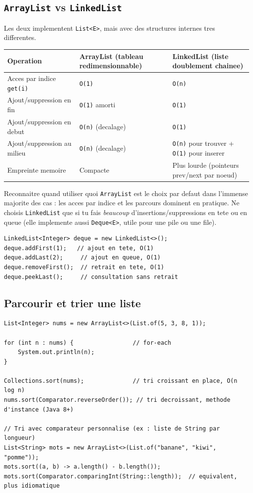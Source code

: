 \documentclass[11pt,a4paper]{article}
\begin{document}
\subsection{\texttt{ArrayList} vs \texttt{LinkedList}}

Les deux implementent \texttt{List<E>}, mais avec des structures internes tres
differentes.

\begin{longtable}{p{3.2cm}p{5.4cm}p{5.4cm}}
\toprule
\textbf{Operation} & \textbf{ArrayList} (tableau redimensionnable) & \textbf{LinkedList} (liste doublement chainee) \\
\midrule
\endhead
Acces par indice \texttt{get(i)} & \texttt{O(1)} & \texttt{O(n)} \\
Ajout/suppression en fin & \texttt{O(1)} amorti & \texttt{O(1)} \\
Ajout/suppression en debut & \texttt{O(n)} (decalage) & \texttt{O(1)} \\
Ajout/suppression au milieu & \texttt{O(n)} (decalage) & \texttt{O(n)} pour trouver + \texttt{O(1)} pour inserer \\
Empreinte memoire & Compacte & Plus lourde (pointeurs prev/next par noeud) \\
\bottomrule
\end{longtable}

\begin{infobox}{Reconnaitre quand utiliser quoi}
\texttt{ArrayList} est le choix par defaut dans l'immense majorite des cas :
les acces par indice et les parcours dominent en pratique. Ne choisis
\texttt{LinkedList} que si tu fais \emph{beaucoup} d'insertions/suppressions
en tete ou en queue (elle implemente aussi \texttt{Deque<E>}, utile pour une
pile ou une file).
\end{infobox}

\begin{lstlisting}
LinkedList<Integer> deque = new LinkedList<>();
deque.addFirst(1);   // ajout en tete, O(1)
deque.addLast(2);     // ajout en queue, O(1)
deque.removeFirst();  // retrait en tete, O(1)
deque.peekLast();     // consultation sans retrait
\end{lstlisting}

\subsection{Parcourir et trier une liste}

\begin{lstlisting}
List<Integer> nums = new ArrayList<>(List.of(5, 3, 8, 1));

for (int n : nums) {                 // for-each
    System.out.println(n);
}

Collections.sort(nums);              // tri croissant en place, O(n log n)
nums.sort(Comparator.reverseOrder()); // tri decroissant, methode d'instance (Java 8+)

// Tri avec comparateur personnalise (ex : liste de String par longueur)
List<String> mots = new ArrayList<>(List.of("banane", "kiwi", "pomme"));
mots.sort((a, b) -> a.length() - b.length());
mots.sort(Comparator.comparingInt(String::length));  // equivalent, plus idiomatique
\end{lstlisting}
\end{document}
